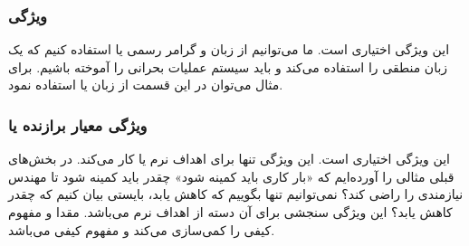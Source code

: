 \subsubsection{ویژگی }

این ویژگی اختیاری است. ما می‌توانیم از زبان و گرامر رسمی یا  استفاده
کنیم که یک زبان منطقی را استفاده می‌کند و باید سیستم عملیات بحرانی را آموخته
باشیم. برای مثال می‌توان در این قسمت از زبان  یا  استفاده نمود.

\subsubsection{ویژگی معیار برازنده یا }

این ویژگی اختیاری است. این ویژگی تنها برای اهداف نرم یا  کار
می‌کند. در بخش‌های قبلی مثالی را آورده‌ایم که «بار کاری باید کمینه شود» چقدر
باید کمینه شود تا مهندس نیازمندی را راضی کند؟ نمی‌توانیم تنها بگوییم که کاهش
یابد، بایستی بیان کنیم که چقدر کاهش یابد؟ این ویژگی سنجشی برای آن دسته از اهداف
نرم می‌باشد. مقدا و مفهوم کیفی را کمی‌سازی می‌کند و مفهوم کیفی 
می‌باشد.
